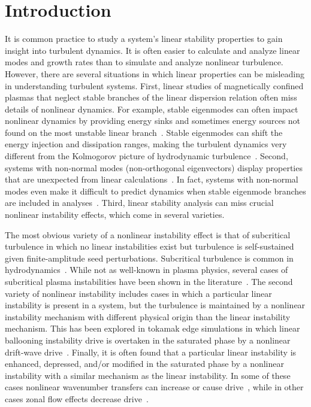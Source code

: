 \documentclass[showpacs,preprintnumbers,amsmath,amssymb,superscriptaddress,aip]{revtex4-1}
\begin{document}
\section{Introduction}
It is common practice to study a system's linear stability properties to gain insight into turbulent dynamics. It is often easier to calculate and analyze linear modes and growth rates than
to simulate and analyze nonlinear turbulence. However, there are several situations in which linear properties can be misleading in understanding turbulent systems. First,
linear studies of magnetically confined plasmas that neglect stable branches of the linear dispersion relation often miss details of nonlinear dynamics. For example, stable eigenmodes can often
impact nonlinear dynamics by providing energy sinks and sometimes energy sources not found on the most unstable linear 
branch~\cite{baver2002,terry2002,terry2006a,terry2006b,gatto2006,terry2009,hatch2009,kim2010,makwana2011,hatch2011}. Stable eigenmodes can shift
the energy injection and dissipation ranges, making the turbulent dynamics very different from the Kolmogorov picture of hydrodynamic turbulence~\cite{Kolmogorov1941}.
Second, systems with non-normal modes (non-orthogonal eigenvectors) display properties that are unexpected from linear calculations~\cite{camargo1998}. 
In fact, systems with non-normal modes even make it difficult to predict dynamics
when stable eigenmode branches are included in analyses~\cite{kim2010}. Third, linear stability analysis can miss crucial nonlinear instability effects, which come in several varieties. 

The most obvious variety of a nonlinear instability effect is that of subcritical turbulence in which no linear instabilities exist but turbulence is self-sustained 
given finite-amplitude seed perturbations. Subcritical turbulence is
common in hydrodynamics~\cite{manneville2008}.  While not as well-known in plasma physics,
several cases of subcritical plasma instabilities have been shown in the
literature~\cite{scott1990,scott1992,drake1995,nordman1993,waltz1985,itoh1996,highcock2012}.
The second variety of nonlinear instability includes cases in which a particular linear instability is present in a system, but the turbulence is maintained
by a nonlinear instability mechanism with different physical origin
than the linear instability mechanism. This has been explored in tokamak edge simulations in which
linear ballooning instability drive is overtaken in the saturated phase by a nonlinear drift-wave drive~\cite{zeiler1996,zeiler1997,scott2002,scott2003,scott2005}.
Finally, it is often found that a particular linear instability is enhanced, depressed, and/or  modified in the saturated phase by a nonlinear instability with a similar mechanism 
as the linear instability. In some of these cases nonlinear wavenumber transfers can increase or cause drive~\cite{biskamp1995,korsholm1999}, while in other cases zonal flow effects
decrease drive~\cite{dimits2000,ernst2004}. 
\end{document}
